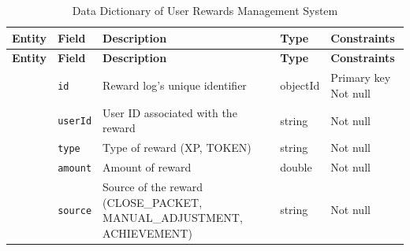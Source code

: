\begin{landscape}
    \begin{longtable}{ | m{} | m{} | m{} | m{} | m{} | }
        \caption{Data Dictionary of User Rewards Management System}   \label{database-architecture}                                                                                                                                                                  \\
        \hline
        \textbf{Entity}                                                  & \textbf{Field}                            & \textbf{Description}                                                 & \textbf{Type} & \textbf{Constraints}          \\
        \hline
        \endfirsthead
        \hline
        \textbf{Entity}                                                  & \textbf{Field}                            & \textbf{Description}                                                 & \textbf{Type} & \textbf{Constraints}          \\
        \hline
        \endhead
        \hline
        \endfoot
        \endlastfoot
        \multirow[t]{8}{5em}{\textbf{RewardLog}}                         & \texttt{id}                               & Reward log's unique identifier                                       & objectId      & Primary key \newline Not null \\
        \cline{2-5}
                                                                         & \texttt{userId}                           & User ID associated with the reward                                   & string        & Not null                      \\
        \cline{2-5}
                                                                         & \texttt{type}                             & Type of reward (XP, TOKEN)                                           & string        & Not null                      \\
        \cline{2-5}
                                                                         & \texttt{amount}                           & Amount of reward                                                     & double        & Not null                      \\
        \cline{2-5}
                                                                         & \texttt{source}                           & Source of the reward (CLOSE\_PACKET, MANUAL\_ADJUSTMENT, ACHIEVEMENT) & string       & Not null                      \\

\end{longtable}
\end{landscape}
